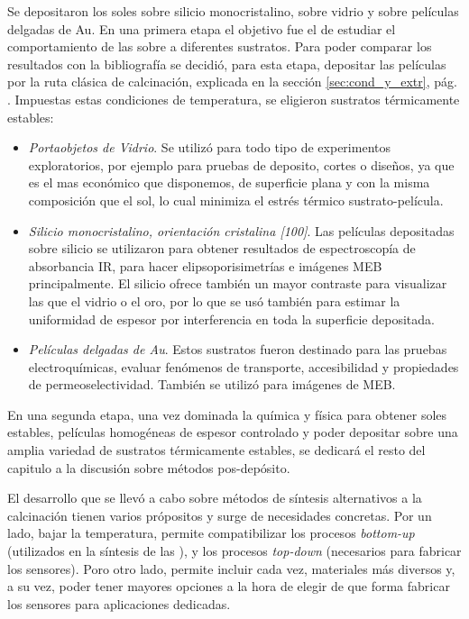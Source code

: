 	Se depositaron los soles sobre silicio monocristalino, sobre vidrio y sobre películas delgadas de Au. En una primera etapa el objetivo fue el de estudiar el comportamiento de las \pdm\space sobre a diferentes sustratos. Para poder comparar los resultados con la bibliografía\cite{Soler-Illia2006,Brinker1990} se decidió, para esta etapa, depositar las películas por la ruta clásica de calcinación, explicada en la sección \ref{sec:cond_y_extr}, pág. \pageref{sec:cond_y_extr}. Impuestas estas condiciones de temperatura, se eligieron sustratos térmicamente estables:

		\begin{itemize}

			\item \textit{Portaobjetos de Vidrio}. Se utilizó para todo tipo de experimentos exploratorios, por ejemplo para pruebas de deposito, cortes o diseños, ya que es el mas económico que disponemos, de superficie plana y con la misma composición que el sol, lo cual minimiza el estrés térmico sustrato-película.

			\item \textit{Silicio monocristalino, orientación cristalina [100]}. Las películas depositadas sobre silicio se utilizaron para obtener resultados de espectroscopía de absorbancia IR, para hacer elipsoporisimetrías e imágenes MEB principalmente. El silicio ofrece también un mayor contraste para visualizar las \pdm\space que el vidrio o el oro, por lo que se usó también para estimar la uniformidad de espesor por interferencia en toda la superficie depositada.
		
			\item \textit{Películas delgadas de Au}. Estos sustratos fueron destinado para las pruebas electroquímicas, evaluar fenómenos de transporte, accesibilidad y propiedades de permeoselectividad. También se utilizó para imágenes de MEB.

			\end{itemize}
	
	En una segunda etapa, una vez dominada la química y física para obtener soles estables, películas homogéneas de espesor controlado y poder depositar sobre una amplia variedad de sustratos térmicamente estables, se dedicará el resto del capitulo a la discusión sobre métodos pos-depósito. 

	El desarrollo que se llevó a cabo sobre métodos de síntesis alternativos a la calcinación tienen varios própositos y surge de necesidades concretas. Por un lado, bajar la temperatura, permite compatibilizar los procesos \textit{bottom-up} (utilizados en la síntesis de las \pdm), y los procesos \textit{top-down} (necesarios para fabricar los sensores). Poro otro lado, permite incluir cada vez, materiales más diversos y, a su vez, poder tener mayores opciones a la hora de elegir de que forma fabricar los sensores para aplicaciones dedicadas\cite{Doshi2000a,Wagner2013,Innocenzi2013,Soler-Illia2002a}.

